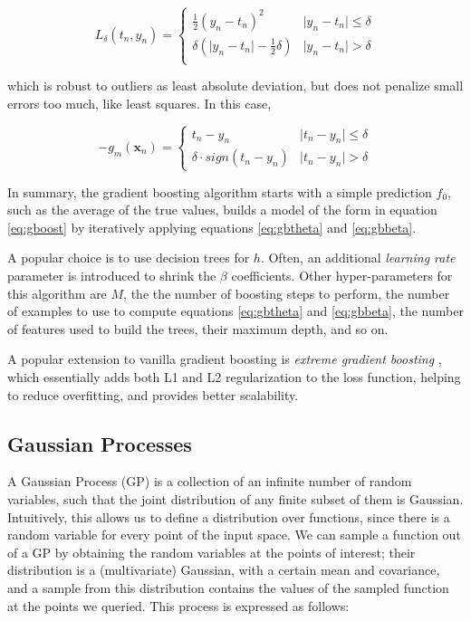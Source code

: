\documentclass[a4paper]{book}
\begin{document}
\begin{equation}
\label{eq:huberloss}
L_\delta(t_n,y_n)=\begin{cases}
\frac{1}{2}(y_n-t_n)^2 & \vert y_n-t_n \vert \leq \delta \\
\delta(\vert y_n-t_n\vert-\frac{1}{2}\delta) & \vert y_n-t_n \vert > \delta \\
\end{cases}
\end{equation}

\noindent which is robust to outliers as least absolute deviation, but does not penalize small errors too much, like least squares. In this case,

\begin{equation}
-g_m(\bm x_n)=\begin{cases}
t_n-y_n & \vert t_n-y_n\vert\leq\delta \\
\delta\cdot sign(t_n-y_n) & \vert t_n-y_n\vert>\delta
\end{cases}
\end{equation}

In summary, the gradient boosting algorithm starts with a simple prediction $f_0$, such as the average of the true values, builds a model of the form in equation \ref{eq:gboost} by iteratively applying equations \ref{eq:gbtheta} and \ref{eq:gbbeta}.

A popular choice is to use decision trees for $h$. Often, an additional \emph{learning rate} parameter is introduced to shrink the $\beta$ coefficients. Other hyper-parameters for this algorithm are $M$, the the number of boosting steps to perform, the number of examples to use to compute equations \ref{eq:gbtheta} and \ref{eq:gbbeta}, the number of features used to build the trees, their maximum depth, and so on.

A popular extension to vanilla gradient boosting is \emph{extreme gradient boosting} \citep{xgboost}, which essentially adds both L1 and L2 regularization to the loss function, helping to reduce overfitting, and provides better scalability.

\subsection{Gaussian Processes}
A Gaussian Process (GP) is a collection of an infinite number of random variables, such that the joint distribution of any finite subset of them is Gaussian. Intuitively, this allows us to define a distribution over functions, since there is a random variable for every point of the input space. We can sample a function out of a GP by obtaining the random variables at the points of interest; their distribution is a (multivariate) Gaussian, with a certain mean and covariance, and a sample from this distribution contains the values of the sampled function at the points we queried. This process is expressed as follows:
\end{document}
